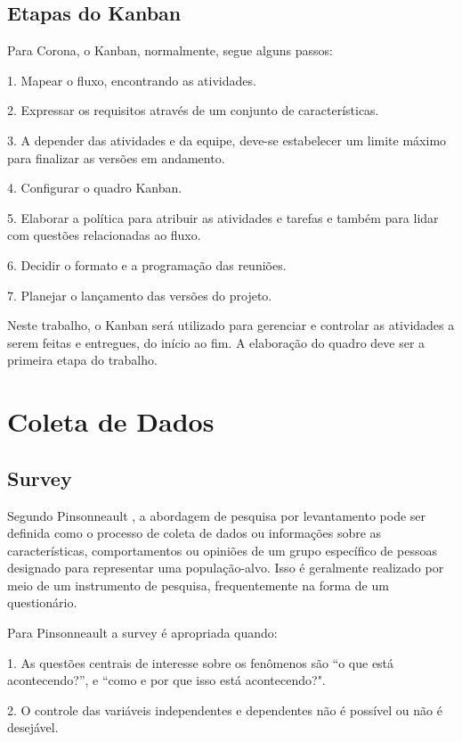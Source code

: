 \subsection{Etapas do Kanban}

Para Corona\cite{corona2013review}, o Kanban, normalmente, segue alguns passos:

1. Mapear o fluxo, encontrando as atividades.

2. Expressar os requisitos através de um conjunto de características.

3. A depender das atividades e da equipe, deve-se estabelecer um limite máximo para finalizar as versões em andamento.

4. Configurar o quadro Kanban.

5. Elaborar a política para atribuir as atividades e tarefas e também para lidar com questões relacionadas ao fluxo.

6. Decidir o formato e a programação das reuniões.

7. Planejar o lançamento das versões do projeto.

Neste trabalho, o Kanban será utilizado para gerenciar e controlar as atividades a serem feitas e entregues, do início ao fim. A elaboração do quadro deve ser a primeira etapa do trabalho.

\section{Coleta de Dados}

\subsection{Survey}

Segundo Pinsonneault \cite{pinsonneault1993survey}, a abordagem de pesquisa por levantamento pode ser definida como o processo de coleta de dados ou informações sobre as características, comportamentos ou opiniões de um grupo específico de pessoas designado para representar uma população-alvo. Isso é geralmente realizado por meio de um instrumento de pesquisa, frequentemente na forma de um questionário.

Para Pinsonneault \cite{pinsonneault1993survey} a survey é apropriada quando:

1. As questões centrais de interesse sobre os fenômenos são “o que está acontecendo?”, e “como e por que isso está acontecendo?".

2. O controle das variáveis independentes e dependentes não é possível ou não é desejável.

